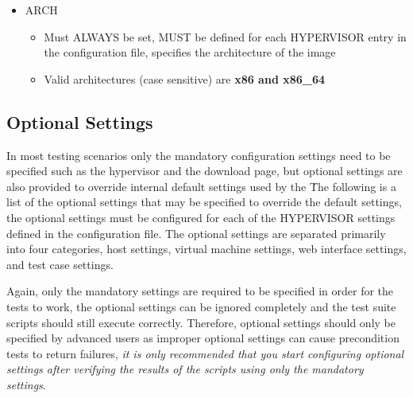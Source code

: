 \begin{itemize}
\item	ARCH
		\begin{itemize}
		\item	Must ALWAYS be set, MUST be defined for each HYPERVISOR entry in the configuration
				file, specifies the architecture of the \cernvm image
		\item	Valid architectures (case sensitive) are {\bf x86 and x86\_64}
		\end{itemize}
\end{itemize}




\subsection{Optional Settings}
\label{sct:optionalsettings}

In most testing scenarios only the mandatory configuration settings need to be specified such as the hypervisor and 
the download page, but optional settings are also provided to override internal default settings used by the 
\cernvmtestframework\. The following is a list of the optional settings that may be specified to override the default
settings, the optional settings must be configured for each of the HYPERVISOR settings defined in the configuration file.
The optional settings are separated primarily into four categories, host settings, virtual machine settings, web interface
settings, and test case settings. 

Again, only the mandatory settings are required to be specified in order for the tests to work, the optional settings 
can be ignored completely and the test suite scripts should still execute correctly. Therefore, optional settings should
only be specified by advanced users as improper optional settings can cause precondition tests to return failures,
\emph{it is only recommended that you start configuring optional settings after verifying the results of the scripts 
using only the mandatory settings}.


